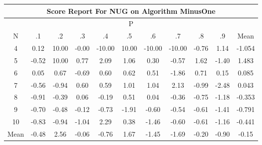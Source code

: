 \documentclass[11pt,a4paper]{report}
\begin{document}
\begin{longtable}{ | c || c | c | c | c | c | c | c | c | c || c |}
\hline
\multicolumn{11}{|c|}{ Score Report For NUG on Algorithm MinusOne} \\
\hline
\multicolumn{11}{|c|}{ P } \\
\hline
N & .1 & .2 & .3 & .4 & .5 & .6 & .7 & .8 & .9 & Mean\\
 \hline
 \hline
 \endhead
  4 &  \cellcolor[HTML]{FFFFFF} 0.12 &  \cellcolor[HTML]{0808FF} 10.00 &  \cellcolor[HTML]{FFFFFF} -0.00 &  \cellcolor[HTML]{FF0000} -10.00 &  \cellcolor[HTML]{0808FF} 10.00 &  \cellcolor[HTML]{FF0000} -10.00 &  \cellcolor[HTML]{FF0000} -10.00 &  \cellcolor[HTML]{FFEFEF} -0.76 &  \cellcolor[HTML]{DFDFFF} 1.14 & -1.054 \\
  5 &  \cellcolor[HTML]{FFEFEF} -0.52 &  \cellcolor[HTML]{0808FF} 10.00 &  \cellcolor[HTML]{EFEFFF} 0.77 &  \cellcolor[HTML]{C7C7FF} 2.09 &  \cellcolor[HTML]{E7E7FF} 1.06 &  \cellcolor[HTML]{F7F7FF} 0.30 &  \cellcolor[HTML]{FFEFEF} -0.57 &  \cellcolor[HTML]{D7D7FF} 1.62 &  \cellcolor[HTML]{FFDFDF} -1.40 & 1.483 \\
  6 &  \cellcolor[HTML]{FFFFFF} 0.05 &  \cellcolor[HTML]{EFEFFF} 0.67 &  \cellcolor[HTML]{FFEFEF} -0.69 &  \cellcolor[HTML]{EFEFFF} 0.60 &  \cellcolor[HTML]{EFEFFF} 0.62 &  \cellcolor[HTML]{EFEFFF} 0.51 &  \cellcolor[HTML]{FFCFCF} -1.86 &  \cellcolor[HTML]{EFEFFF} 0.71 &  \cellcolor[HTML]{FFFFFF} 0.15 & 0.085 \\
  7 &  \cellcolor[HTML]{FFEFEF} -0.56 &  \cellcolor[HTML]{FFE7E7} -0.94 &  \cellcolor[HTML]{EFEFFF} 0.60 &  \cellcolor[HTML]{EFEFFF} 0.59 &  \cellcolor[HTML]{E7E7FF} 1.01 &  \cellcolor[HTML]{E7E7FF} 1.04 &  \cellcolor[HTML]{C7C7FF} 2.13 &  \cellcolor[HTML]{FFE7E7} -0.99 &  \cellcolor[HTML]{FFBFBF} -2.48 & 0.043 \\
  8 &  \cellcolor[HTML]{FFE7E7} -0.91 &  \cellcolor[HTML]{FFF7F7} -0.39 &  \cellcolor[HTML]{FFFFFF} 0.06 &  \cellcolor[HTML]{FFF7F7} -0.19 &  \cellcolor[HTML]{EFEFFF} 0.51 &  \cellcolor[HTML]{FFFFFF} 0.04 &  \cellcolor[HTML]{FFF7F7} -0.36 &  \cellcolor[HTML]{FFEFEF} -0.75 &  \cellcolor[HTML]{FFDFDF} -1.18 & -0.353 \\
  9 &  \cellcolor[HTML]{FFEFEF} -0.70 &  \cellcolor[HTML]{FFEFEF} -0.48 &  \cellcolor[HTML]{FFFFFF} -0.12 &  \cellcolor[HTML]{FFEFEF} -0.73 &  \cellcolor[HTML]{FFCFCF} -1.91 &  \cellcolor[HTML]{FFEFEF} -0.60 &  \cellcolor[HTML]{FFEFEF} -0.54 &  \cellcolor[HTML]{FFEFEF} -0.61 &  \cellcolor[HTML]{FFDFDF} -1.41 & -0.791 \\
  10 &  \cellcolor[HTML]{FFE7E7} -0.83 &  \cellcolor[HTML]{FFE7E7} -0.94 &  \cellcolor[HTML]{FFE7E7} -1.04 &  \cellcolor[HTML]{C7C7FF} 2.29 &  \cellcolor[HTML]{F7F7FF} 0.38 &  \cellcolor[HTML]{FFD7D7} -1.46 &  \cellcolor[HTML]{FFEFEF} -0.60 &  \cellcolor[HTML]{FFEFEF} -0.61 &  \cellcolor[HTML]{FFDFDF} -1.16 & -0.441 \\
 \hline
 \hline
Mean &  \cellcolor[HTML]{FFEFEF} -0.48 &  \cellcolor[HTML]{BFBFFF} 2.56 &  \cellcolor[HTML]{FFFFFF} -0.06 &  \cellcolor[HTML]{FFEFEF} -0.76 &  \cellcolor[HTML]{D7D7FF} 1.67 &  \cellcolor[HTML]{FFD7D7} -1.45 &  \cellcolor[HTML]{FFD7D7} -1.69 &  \cellcolor[HTML]{FFF7F7} -0.20 &  \cellcolor[HTML]{FFE7E7} -0.90 &  \cellcolor[HTML]{FFFFFF} -0.15
\end{longtable}
\end{document}
